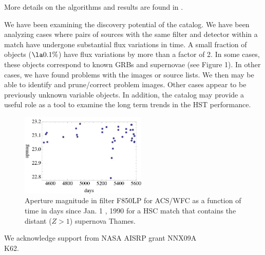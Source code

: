 More details on the algorithms and results are found in \cite{2012arXiv1206.0644B}.

We have been examining the discovery potential of the catalog. We have been analyzing cases where pairs of sources with the same filter and detector within a match have undergone substantial flux variations in time. A small fraction of objects ($\la 0.1 \%$) have flux variations by more than a factor of 2. In some cases, these    objects correspond to known GRBs and supernovae (see Figure 1).  In other cases, we have found problems with the images or source lists. We then may be able to identify and prune/correct problem images. Other cases appear to be previously unknown variable objects. In addition, the catalog may provide a useful role as a tool to examine the long term trends in the HST performance.


\begin{figure}
\centering
\includegraphics[width=6.0cm]{part8/Lubow_O21/O21_1.eps}
\caption{Aperture magnitude in filter F850LP for ACS/WFC as a function of time in days since Jan. 1 , 1990 for a HSC match that contains the distant ($Z> 1$) supernova Thames.}
\end{figure}


\acknowledgements We acknowledge support from NASA AISRP grant NNX09A\\K62.


